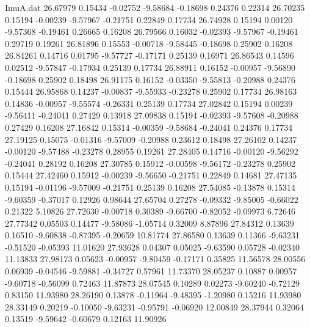 \begin{filecontents}{ImuA.dat}
  26.67979    0.15434   -0.02752   -9.58684   -0.18698    0.24376    0.22314
  26.70235    0.15194   -0.00239   -9.57967   -0.21751    0.22849    0.17734
  26.74928    0.15194    0.00120   -9.57368   -0.19461    0.26665    0.16208
  26.79566    0.16032   -0.02393   -9.57967   -0.19461    0.29719    0.19261
  26.81896    0.15553   -0.00718   -9.58445   -0.18698    0.25902    0.16208
  26.84261    0.14716    0.01795   -9.57727   -0.17171    0.25139    0.16971
  26.86543    0.14596    0.02512   -9.57847   -0.17934    0.25139    0.17734
  26.88911    0.16152   -0.00957   -9.56890   -0.18698    0.25902    0.18498
  26.91175    0.16152   -0.03350   -9.55813   -0.20988    0.24376    0.15444
  26.95868    0.14237   -0.00837   -9.55933   -0.23278    0.25902    0.17734
  26.98163    0.14836   -0.00957   -9.55574   -0.26331    0.25139    0.17734
  27.02842    0.15194    0.00239   -9.56411   -0.24041    0.27429    0.13918
  27.09838    0.15194   -0.02393   -9.57608   -0.20988    0.27429    0.16208
  27.16842    0.15314   -0.00359   -9.58684   -0.24041    0.24376    0.17734
  27.19125    0.15075   -0.01316   -9.57009   -0.20988    0.23612    0.18498
  27.26102    0.14237   -0.00120   -9.57488   -0.23278    0.28955    0.19261
  27.28405    0.14716   -0.00120   -9.56292   -0.24041    0.28192    0.16208
  27.30785    0.15912   -0.00598   -9.56172   -0.23278    0.25902    0.15444
  27.42460    0.15912   -0.00239   -9.56650   -0.21751    0.22849    0.14681
  27.47135    0.15194   -0.01196   -9.57009   -0.21751    0.25139    0.16208
  27.54085   -0.13878    0.15314   -9.60359   -0.37017    0.12926    0.98644
  27.65704    0.27278   -0.09332   -9.85005   -0.66022    0.21322    5.10826
  27.72630   -0.00718    0.30389   -9.66700   -0.82052   -0.09973    6.72646
  27.77342    0.05503    0.14477   -9.58086   -1.05714    0.32009    8.87896
  27.84312    0.13639    0.16510   -9.60838   -0.87395   -0.20659   10.81774
  27.86580    0.13639    0.11366   -9.63231   -0.51520   -0.05393   11.01620
  27.93628    0.04307    0.05025   -9.63590    0.05728   -0.02340   11.13833
  27.98173    0.05623   -0.00957   -9.80459   -0.17171    0.35825   11.56578
  28.00556    0.06939   -0.04546   -9.59881   -0.34727    0.57961   11.73370
  28.05237    0.10887    0.00957   -9.60718   -0.56099    0.72463   11.87873
  28.07545    0.10289    0.02273   -9.60240   -0.72129    0.83150   11.93980
  28.26190    0.13878   -0.11964   -9.48395   -1.20980    0.15216   11.93980
  28.33149    0.20219   -0.10050   -9.63231   -0.95791   -0.06920   12.00849
  28.37944    0.32064    0.13519   -9.59642   -0.60679    0.12163   11.90926

\end{filecontents}
